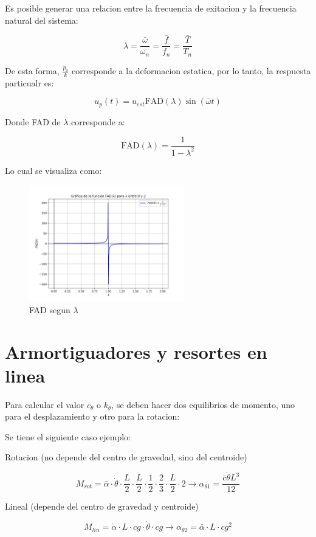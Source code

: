 \documentclass{article}  %
\begin{document}
Es posible generar una relacion entre la frecuencia de exitacion y la frecuencia natural del sistema:

\begin{equation}
    \lambda = \frac{\bar{\omega}}{\omega_n} = \frac{\bar{f}}{f_n} = \frac{\bar{T}}{T_n}
\end{equation}

De esta forma, $\frac{p_0}{k}$ corresponde a la deformacion estatica, por lo tanto, la respuesta particualr es:

\begin{equation}
    u_p(t) = u_{est} \text{FAD}(\lambda) \sin(\bar{\omega} t)
\end{equation}

Donde FAD de $\lambda$ corresponde a:

\begin{equation}
    \text{FAD}(\lambda) = \frac{1}{1-\lambda^2}
\end{equation}

Lo cual se visualiza como:

\begin{figure}[H]
    \centering
    \includegraphics[width=0.6\textwidth]{GRAFICOS/FAD.png}
    \caption{FAD segun $\lambda$}
    \label{fig:ejemplo1}
\end{figure}

\section{Armortiguadores y resortes en linea}

Para calcular el valor $c_\theta$ o $k_\theta$, se deben hacer dos equilibrios de momento, uno para el desplazamiento y otro para la rotacion:

Se tiene el siguiente caso ejemplo:

Rotacion (no depende del centro de gravedad, sino del centroide)

\begin{equation}
    M_{rot} = \bar{\alpha}\cdot \dot{\theta}\cdot \frac{L}{2}\cdot \frac{L}{2}\cdot \frac{1}{2}\cdot \frac{2}{3}\cdot \frac{L}{2} \cdot 2 \rightarrow \alpha_{\theta 1} = \frac{\bar{c} \dot{\theta} L^3}{12}
\end{equation}

Lineal (depende del centro de gravedad y centroide)

\begin{equation}
    M_{lin} = \dot{\alpha} \cdot L \cdot cg \cdot \dot{\theta} \cdot cg \rightarrow \alpha_{\theta 2} = \bar{\alpha} \cdot L \cdot cg^2
\end{equation}
\end{document}
